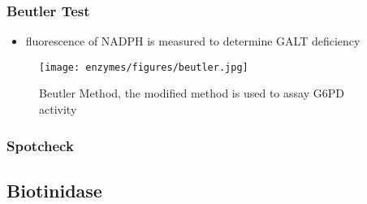 \documentclass[12pt]{scrartcl}
\begin{document}
\subsubsection{Beutler Test}
\label{sec:org7f571c7}

\begin{center}

\vspace{20}


\vspace{20}


\vspace{20}

\end{center}

\begin{itemize}
\item fluorescence of NADPH is measured to determine GALT deficiency
\end{itemize}

\begin{figure}[htbp]
\centering
\texttt{[image: enzymes/figures/beutler.jpg]}
\caption{\label{fig:orgd53fb3a}Beutler Method, the modified method is used to assay G6PD activity}
\end{figure}


\subsubsection{Spotcheck}
\label{sec:org5b59365}

\begin{center}

\vspace{20}


\vspace{20}


\vspace{20}

\end{center}

\subsection{Biotinidase}
\label{sec:org149690d}
\end{document}
